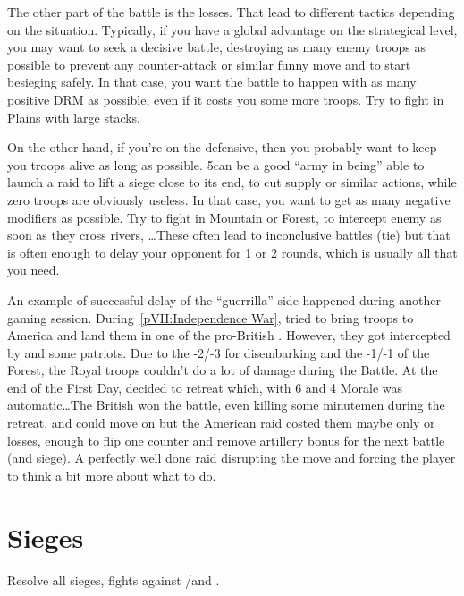\begin{playtip}[Losses]
  The other part of the battle is the losses. That lead to different tactics
  depending on the situation. Typically, if you have a global advantage on the
  strategical level, you may want to seek a decisive battle, destroying as
  many enemy troops as possible to prevent any counter-attack or similar funny
  move and to start besieging safely. In that case, you want the battle to
  happen with as many positive DRM as possible, even if it costs you some more
  troops. Try to fight in Plains with large stacks.

  On the other hand, if you're on the defensive, then you probably want to
  keep you troops alive as long as possible. 5\LD can be a good ``army in
  being'' able to launch a raid to lift a siege close to its end, to cut
  supply or similar actions, while zero troops are obviously useless. In that
  case, you want to get as many negative modifiers as possible. Try to fight
  in Mountain or Forest, to intercept enemy as soon as they cross rivers,
  \ldots These often lead to inconclusive battles (tie) but that is often
  enough to delay your opponent for 1 or 2 rounds, which is usually all that
  you need.

  \smallskip

  An example of successful delay of the ``guerrilla'' side happened during
  another gaming session. During~\ref{pVII:Independence War}, \ANG tried to
  bring troops to America and land them in one of the pro-British
  \COL. However, they got intercepted by  and some
  patriots. Due to the -2/-3 for disembarking and the -1/-1 of the Forest, the
  Royal troops couldn't do a lot of damage during the Battle. At the end of
  the First Day,  decided to retreat which, with 6 \Man and
  4 Morale was automatic\ldots The British won the battle, even killing some
  minutemen during the retreat, and could move on but the American raid costed
  them maybe only \texttu or \texttd losses, enough to flip one \ARMY counter
  and remove artillery bonus for the next battle (and siege). A perfectly well
  done raid disrupting the \ANG move and forcing the player to think a bit
  more about what to do.
\end{playtip}

\section{Sieges}
\label{chMilitary:Sieges}
Resolve all sieges, fights against \REVOLT/\REBELLION and \corsaire.

